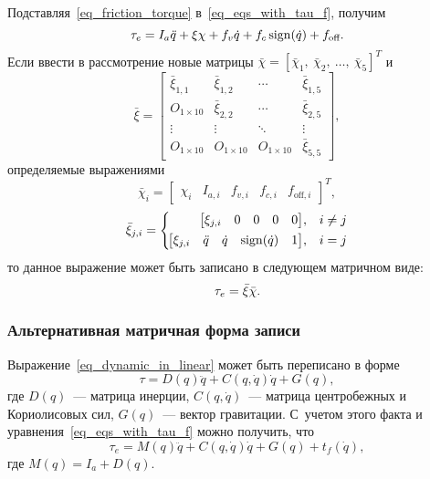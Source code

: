 Подставляя~\eqref{eq_friction_torque} в~\eqref{eq_eqs_with_tau_f}, получим
\begin{equation}
     \tau_e = I_a \ddot{q} + \xi \chi + f_v \dot{q} + f_c \operatorname{sign}(\dot{q}) + f_\text{off}\ldotp
\end{equation}
Если ввести в рассмотрение новые матрицы $\bar{\chi}=[\bar{\chi}_1, \: \bar\chi_2, \: \ldots, \: \bar\chi_5]^T$ и\linebreak
\begin{equation}
    \bar\xi =
    \begin{bmatrix}
        \bar\xi_{1,1} & \bar\xi_{1,2} & \cdots & \bar\xi_{1,5} \\
        O_{1 \times 10} & \bar\xi_{2,2} & \cdots & \bar\xi_{2,5} \\
        \vdots & \vdots & \ddots & \vdots \\
        O_{1 \times 10} & O_{1 \times 10} & O_{1 \times 10} & \bar\xi_{5,5}
    \end{bmatrix}\!\!,
\end{equation}
определяемые выражениями
\begin{equation}
    \bar{\chi}_i =
    \begin{bmatrix}
        \chi_i & I_{a,i} & f_{v,i} & f_{c,i} & f_{\text{off},i}
    \end{bmatrix}^T\!\!\!\!,
\end{equation}
\begin{equation}
    \bar{\xi}_{j,i} =
    \left\{
    \begin{aligned}
        \!\begin{bmatrix}\xi_{j,i} & 0 & 0 & 0 & 0\end{bmatrix}&, && i \ne j \\
        \!\begin{bmatrix}\xi_{j,i} & \ddot{q} & \dot{q} & \operatorname{sign}(\dot{q}) & 1\end{bmatrix}&, &&i = j
	\end{aligned}
	\right.
\end{equation}
то данное выражение может быть записано в следующем матричном виде:
\begin{equation}\label{eq_extended_dynamic_in_linear}
    \tau_e = \bar\xi \bar\chi \ldotp
\end{equation}

\subsubsection{Альтернативная матричная форма записи}
Выражение~\eqref{eq_dynamic_in_linear} может быть переписано в форме
\begin{equation}
    \tau = D(q) \ddot{q} + C(q,\dot{q}) \dot{q} + G(q),
\end{equation}
где $D(q)$~--- матрица инерции, $C(q,\dot{q})$~--- матрица центробежных и Кориолисовых сил, $G(q)$~--- вектор гравитации.
С~учетом этого факта и уравнения~\eqref{eq_eqs_with_tau_f} можно получить, что
\begin{equation}\label{eq_model_with_standard_matrix}
    \tau_e = M(q) \ddot{q} + C(q,\dot{q}) \dot{q} + G(q) + t_f(\dot{q}),
\end{equation}
где $M(q) = I_a + D(q)$.

